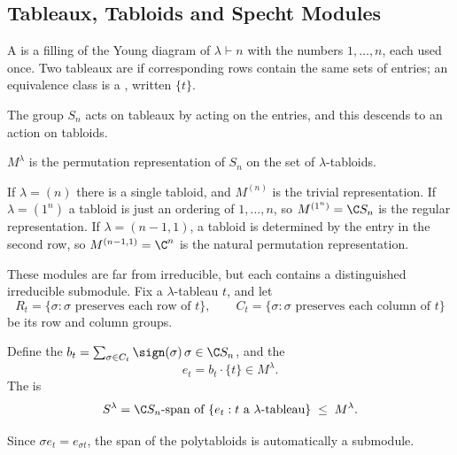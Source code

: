 \subsection{Tableaux, Tabloids and Specht Modules}

\begin{definition}
	A  is a filling of the Young diagram of $\lambda\vdash n$ with the numbers $1,\dots,n$, each used once. Two tableaux are  if corresponding rows contain the same sets of entries; an equivalence class is a , written $\{t\}$.
\end{definition}

The group $S_n$ acts on tableaux by acting on the entries, and this descends to an action on tabloids.

\begin{definition}
	$M^\lambda$ is the permutation representation of $S_n$ on the set of $\lambda$-tabloids.
\end{definition}

\begin{example}
	If $\lambda = (n)$ there is a single tabloid, and $M^{(n)}$ is the trivial representation. If $\lambda = (1^n)$ a tabloid is just an ordering of $1,\dots,n$, so $M^{(1^n)} = \C S_n$ is the regular representation. If $\lambda = (n-1,1)$, a tabloid is determined by the entry in the second row, so $M^{(n-1,1)} = \C^n$ is the natural permutation representation.
\end{example}

These modules are far from irreducible, but each contains a distinguished irreducible submodule. Fix a $\lambda$-tableau $t$, and let
$$R_t = \{\sigma : \sigma \text{ preserves each row of } t\}, \qquad C_t = \{\sigma : \sigma\text{ preserves each column of } t\}$$
be its row and column groups.

\begin{definition}
	Define the  $b_t = \sum_{\sigma\in C_t}\sign(\sigma)\,\sigma \in \C S_n$, and the 
	$$e_t = b_t\cdot\{t\} \in M^\lambda.$$
	The  is
	$$S^\lambda = \C S_n\text{-span of } \{e_t : t \text{ a }\lambda\text{-tableau}\} \; \leq \; M^\lambda.$$
\end{definition}

Since $\sigma e_t = e_{\sigma t}$, the span of the polytabloids is automatically a submodule.

